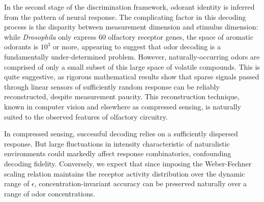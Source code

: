 In the second stage of the discrimination framework, odorant identity is inferred from the pattern of neural response. The complicating factor in this decoding process is the disparity between measurement dimension and stimulus dimension: while \textit{Drosophila} only express 60 olfactory receptor genes, the space of aromatic odorants is $10^3$ or more, appearing to suggest that odor decoding is a fundamentally under-determined problem. However, naturally-occurring odors are comprised of only a small subset of this large space of volatile compounds. This is quite suggestive, as rigorous mathematical results show that sparse signals passed through linear sensors of sufficiently random response can be reliably reconstructed, despite measurement paucity. %
This reconstruction technique, known in computer vision and elsewhere as compressed sensing, is naturally suited to the observed features of olfactory circuitry. %

In compressed sensing, successful decoding relies on a sufficiently dispersed response. But large fluctuations in intensity characteristic of naturalistic environments could markedly affect response combinatorics, confounding decoding fidelity. Conversely, we expect that since imposing the Weber-Fechner scaling relation maintains the receptor activity distribution over the dynamic range of $\epsilon$, concentration-invariant accuracy can be preserved naturally over a range of odor concentrations.

